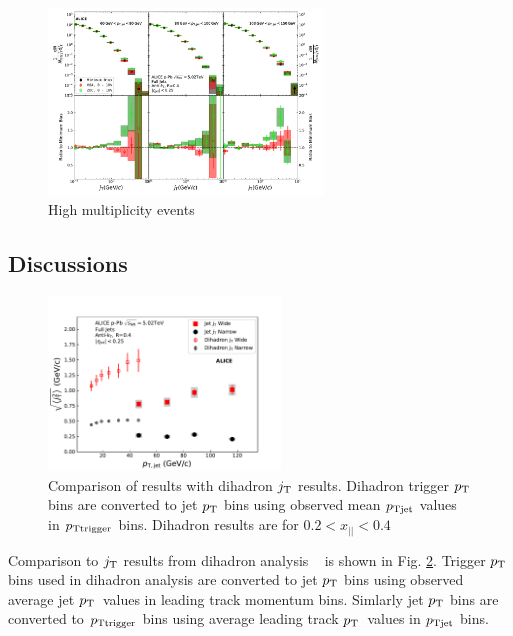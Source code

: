 \begin{figure}[htb]
\begin{center}
\includegraphics[width=0.65\textwidth]{figures/results/HighMJetConeJtSignalPtFrom4To8.pdf}
\caption{High multiplicity events}
\label{fig:jt_highmult}
\end{center}
\end{figure}



\FloatBarrier

\subsection{Discussions}
\begin{figure}[htb]
\centering
\includegraphics[width=0.55\textwidth]{figures/results/RMSWithSystematics_DihadronJetPt}
\caption{Comparison of results with dihadron $j_{\rm T}$ results. Dihadron trigger $p_{\rm T}$ bins are converted to jet $p_{\rm T}$  bins  using observed mean  $p_{\rm Tjet}$ values in $p_{\rm Ttrigger}$ bins. Dihadron results are for $0.2 < x_{||} < 0.4$ }
\label{fig:DihadronComparison}
\end{figure}

Comparison to $j_{\rm T}$ results from dihadron analysis ~\cite{ALICEjt} is shown in Fig. \ref{fig:DihadronComparison}. Trigger $p_{\rm T}$ bins used in dihadron analysis are converted to jet $p_{\rm T}$ bins using observed average jet $p_{\rm T}$ values in leading track momentum bins. Simlarly jet $p_{\rm T}$ bins are converted to $p_{\rm Ttrigger}$ bins using average leading track $p_{\rm T}$ values in $p_{\rm Tjet}$ bins.

